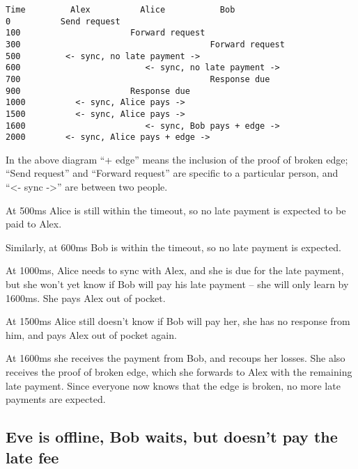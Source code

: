 \documentclass{article}
\begin{document}
\begin{verbatim}
Time         Alex          Alice           Bob
0          Send request
100                      Forward request
300                                      Forward request
500         <- sync, no late payment ->
600                         <- sync, no late payment ->
700                                      Response due
900                      Response due
1000          <- sync, Alice pays ->
1500          <- sync, Alice pays ->
1600                        <- sync, Bob pays + edge ->
2000        <- sync, Alice pays + edge ->
\end{verbatim}

In the above diagram ``+ edge'' means the inclusion of the proof of broken edge; ``Send request'' and ``Forward request'' are specific to a particular person, and ``<- sync ->'' are between two people.

At 500ms Alice is still within the timeout, so no late payment is expected to be paid to Alex.

Similarly, at 600ms Bob is within the timeout, so no late payment is expected.

At 1000ms, Alice needs to sync with Alex, and she is due for the late payment, but she won't yet know if Bob will pay his late payment – she will only learn by 1600ms. She pays Alex out of pocket.

At 1500ms Alice still doesn't know if Bob will pay her, she has no response from him, and pays Alex out of pocket again.

At 1600ms she receives the payment from Bob, and recoups her losses. She also receives the proof of broken edge, which she forwards to Alex with the remaining late payment. Since everyone now knows that the edge is broken, no more late payments are expected.

\subsection{Eve is offline, Bob waits, but doesn't pay the late fee}
\end{document}
